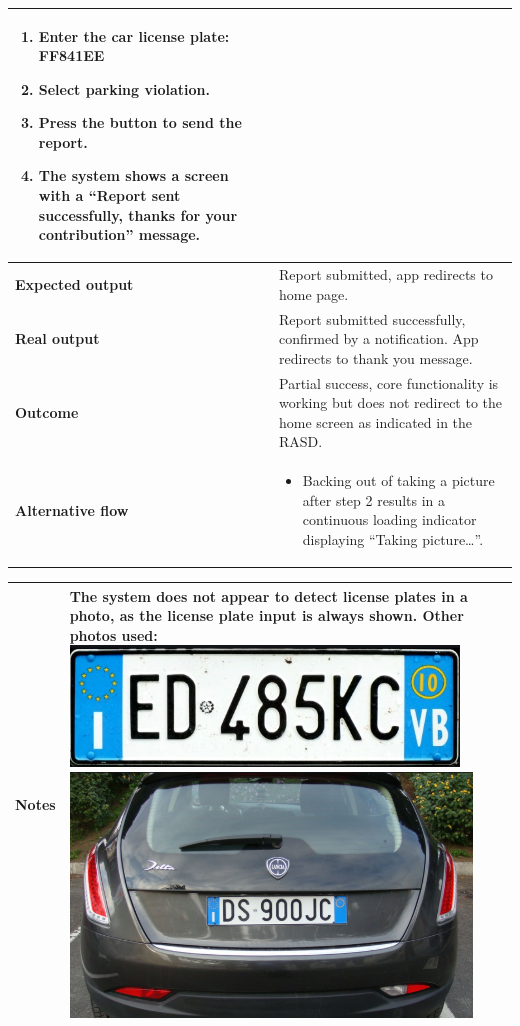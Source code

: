 \begin{table}[H]
\begin{tabular}{p{3cm}p{10cm}}
\begin{enumerate}
            \item Enter the car license plate: FF841EE
            \item Select parking violation.
            \item Press the button to send the report.
            \item The system shows a screen with a “Report sent successfully, thanks for your contribution” message.
        \end{enumerate} \\ \hline
    \textbf{Expected output} & Report submitted, app redirects to home page. \\ \hline
    \textbf{Real output} & Report submitted successfully, confirmed by a notification. App redirects to thank you message. \\ \hline
    \textbf{Outcome} & Partial success, core functionality is working but does not redirect to the home screen as indicated in the RASD. \\ \hline
    \textbf{Alternative flow} & 
        \begin{itemize} \itemsep0em
            \item Backing out of taking a picture after step 2 results in a continuous loading indicator displaying “Taking picture…”.
        \end{itemize} \\ \hline
    
    \end{tabular}
\end{table}

\begin{table}[H]
    \centering
    \begin{tabular}{p{3cm}p{10cm}}
        \textbf{Notes} & The system does not appear to detect license plates in a photo, as the license plate input is always shown.
        Other photos used:
        \includegraphics[width=.3\textwidth]{Images/test-photo2.png}
        \includegraphics[width=.3\textwidth]{Images/test-photo3.png}
     \\ \hline
    \end{tabular}
\end{table}

